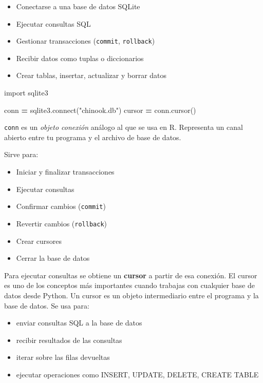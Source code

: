 \documentclass[
]{book}
\newenvironment{Shaded}{\begin{snugshade}}{\end{snugshade}}
\newcommand{\ExtensionTok}[1]{#1}
\newcommand{\ImportTok}[1]{#1}
\newcommand{\NormalTok}[1]{#1}
\newcommand{\OperatorTok}[1]{\textcolor[rgb]{0.81,0.36,0.00}{\textbf{#1}}}
\newcommand{\StringTok}[1]{\textcolor[rgb]{0.31,0.60,0.02}{#1}}
\providecommand{\tightlist}{%
  \setlength{\itemsep}{0pt}\setlength{\parskip}{0pt}}
\theoremstyle{break}
\theoremstyle{nonumberplain}
\begin{document}
\begin{itemize}
\tightlist
\item
  Conectarse a una base de datos SQLite
\item
  Ejecutar consultas SQL
\item
  Gestionar transacciones (\texttt{commit}, \texttt{rollback})
\item
  Recibir datos como tuplas o diccionarios
\item
  Crear tablas, insertar, actualizar y borrar datos
\end{itemize}

\begin{Shaded}
\begin{Highlighting}[]
\ImportTok{import}\NormalTok{ sqlite3}

\NormalTok{conn }\OperatorTok{=}\NormalTok{ sqlite3.}\ExtensionTok{connect}\NormalTok{(}\StringTok{"chinook.db"}\NormalTok{)}
\NormalTok{cursor }\OperatorTok{=}\NormalTok{ conn.cursor()}
\end{Highlighting}
\end{Shaded}

\texttt{conn} es un \emph{objeto conexión} análogo al que se usa en R.
Representa un canal abierto entre tu programa y el archivo de base de datos.

Sirve para:

\begin{itemize}
\tightlist
\item
  Iniciar y finalizar transacciones
\item
  Ejecutar consultas
\item
  Confirmar cambios (\texttt{commit})
\item
  Revertir cambios (\texttt{rollback})
\item
  Crear cursores
\item
  Cerrar la base de datos
\end{itemize}

Para ejecutar consultas se obtiene un \textbf{cursor} a partir de esa conexión.
El cursor es uno de los conceptos más importantes cuando trabajas con cualquier base de datos desde Python.
Un cursor es un objeto intermediario entre el programa y la base de datos.
Se usa para:

\begin{itemize}
\tightlist
\item
  enviar consultas SQL a la base de datos
\item
  recibir resultados de las consultas
\item
  iterar sobre las filas devueltas
\item
  ejecutar operaciones como INSERT, UPDATE, DELETE, CREATE TABLE
\end{itemize}
\end{document}
